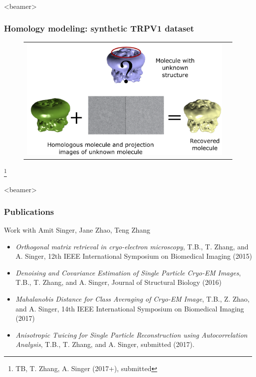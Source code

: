 \documentclass{beamer}
\newcommand\blfootnote[1]{%
  \begingroup
  \renewcommand\thefootnote{}\footnote{#1}%
  \addtocounter{footnote}{-1}%
  \endgroup
}
\begin{document}
\begin{frame}<beamer>
\frametitle{Homology modeling: synthetic TRPV1 dataset}
\begin{figure}[!htbp]
\begin{tabular}{cc}
\includegraphics[width=0.95\linewidth]{figures/trpv1_flowchart.pdf}\label{fig:simtrpv_emdb}
\end{tabular}
\end{figure}\blfootnote{TB, T. Zhang, A. Singer (2017+), submitted}
\end{frame}

\begin{frame}<beamer>
\frametitle{Publications}
Work with Amit Singer, Jane Zhao, Teng Zhang\\
\begin{itemize}
\item \tiny{\textit{Orthogonal matrix retrieval in cryo-electron microscopy}, T.B., T. Zhang, and A. Singer, 12th IEEE International Symposium on Biomedical Imaging (2015)}

\item \tiny{\textit{Denoising and Covariance Estimation of Single Particle Cryo-EM Images}, T.B., T. Zhang, and A. Singer, Journal of Structural Biology (2016)}

\item \textit{Mahalanobis Distance for Class Averaging of Cryo-EM Image}, T.B., Z. Zhao, and A. Singer, 14th IEEE International Symposium on Biomedical Imaging (2017)

\item \textit{Anisotropic Twicing for Single Particle Reconstruction using Autocorrelation Analysis}, T.B., T. Zhang, and A. Singer, submitted (2017).

\end{itemize}
\end{frame}
\end{document}
